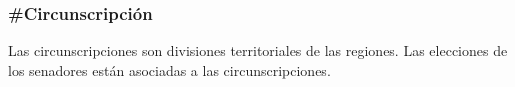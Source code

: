 \subsubsection{\#Circunscripción}

Las circunscripciones son divisiones territoriales de las
regiones. Las elecciones de los senadores están asociadas a las
circunscripciones.

\begin{description}
  
\end{description}